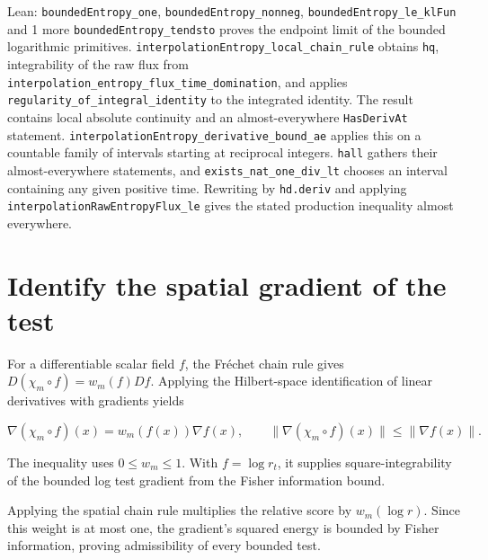 \documentclass[11pt,a4paper]{article}
\begin{document}
\begin{leanbox}{Lean: \texttt{boundedEntropy\_\allowbreak{}one}, \texttt{boundedEntropy\_\allowbreak{}nonneg}, \texttt{boundedEntropy\_\allowbreak{}le\_\allowbreak{}klFun} and 1 more}
\texttt{bounded\allowbreak{}Entropy\_\allowbreak{}tendsto} proves the endpoint limit of the bounded logarithmic primitives. \texttt{interpolation\allowbreak{}Entropy\_\allowbreak{}local\_\allowbreak{}chain\_\allowbreak{}rule} obtains \texttt{hq}, integrability of the raw flux from \texttt{interpolation\_\allowbreak{}entropy\_\allowbreak{}flux\_\allowbreak{}time\_\allowbreak{}domination}, and applies \texttt{regularity\_\allowbreak{}of\_\allowbreak{}integral\_\allowbreak{}identity} to the integrated identity. The result contains local absolute continuity and an almost-everywhere \texttt{Has\allowbreak{}Deriv\allowbreak{}At} statement. \texttt{interpolation\allowbreak{}Entropy\_\allowbreak{}derivative\_\allowbreak{}bound\_\allowbreak{}ae} applies this on a countable family of intervals starting at reciprocal integers. \texttt{hall} gathers their almost-everywhere statements, and \texttt{exists\_\allowbreak{}nat\_\allowbreak{}one\_\allowbreak{}div\_\allowbreak{}lt} chooses an interval containing any given positive time. Rewriting by \texttt{hd.\allowbreak{}deriv} and applying \texttt{interpolation\allowbreak{}Raw\allowbreak{}Entropy\allowbreak{}Flux\_\allowbreak{}le} gives the stated production inequality almost everywhere.
\end{leanbox}

\section{\texorpdfstring{Identify the spatial gradient of the test}{Identify the spatial gradient of the test}}


For a differentiable scalar field \(f\), the Fréchet chain rule gives \(D(\chi_m\circ f)=w_m(f)Df\). Applying the Hilbert-space identification of linear derivatives with gradients yields

\[\nabla(\chi_m\circ f)(x)=w_m(f(x))\nabla f(x),\qquad\|\nabla(\chi_m\circ f)(x)\|\le\|\nabla f(x)\|.\]

The inequality uses \(0\le w_m\le1\). With \(f=\log r_t\), it supplies square-integrability of the bounded log test gradient from the Fisher information bound.



Applying the spatial chain rule multiplies the relative score by \(w_m(\log r)\). Since this weight is at most one, the gradient's squared energy is bounded by Fisher information, proving admissibility of every bounded test.
\end{document}
